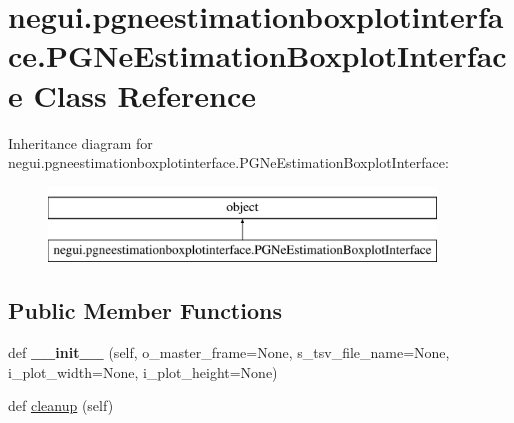 \hypertarget{classnegui_1_1pgneestimationboxplotinterface_1_1PGNeEstimationBoxplotInterface}{}\section{negui.\+pgneestimationboxplotinterface.\+P\+G\+Ne\+Estimation\+Boxplot\+Interface Class Reference}
\label{classnegui_1_1pgneestimationboxplotinterface_1_1PGNeEstimationBoxplotInterface}
Inheritance diagram for negui.\+pgneestimationboxplotinterface.\+P\+G\+Ne\+Estimation\+Boxplot\+Interface\+:\begin{figure}[H]
\begin{center}
\leavevmode
\includegraphics[height=2.000000cm]{classnegui_1_1pgneestimationboxplotinterface_1_1PGNeEstimationBoxplotInterface}
\end{center}
\end{figure}
\subsection*{Public Member Functions}
\begin{DoxyCompactItemize}
\item 
def {\bfseries \+\_\+\+\_\+init\+\_\+\+\_\+} (self, o\+\_\+master\+\_\+frame=None, s\+\_\+tsv\+\_\+file\+\_\+name=None, i\+\_\+plot\+\_\+width=None, i\+\_\+plot\+\_\+height=None)\hypertarget{classnegui_1_1pgneestimationboxplotinterface_1_1PGNeEstimationBoxplotInterface_abfff60d7fe34eb75e8f78133be362c25}{}\label{classnegui_1_1pgneestimationboxplotinterface_1_1PGNeEstimationBoxplotInterface_abfff60d7fe34eb75e8f78133be362c25}

\item 
def \hyperlink{classnegui_1_1pgneestimationboxplotinterface_1_1PGNeEstimationBoxplotInterface_adf723928661375b415aa0038d002089e}{cleanup} (self)
\end{DoxyCompactItemize}
